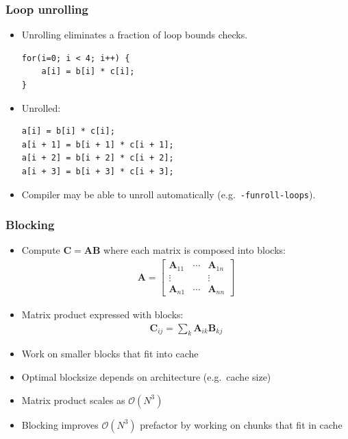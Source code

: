 \documentclass[usenames,dvipsnames,mathserif,compress]{beamer}
\begin{document}
\begin{frame}[fragile]
\frametitle{Loop unrolling}
\begin{itemize}
\item Unrolling eliminates a fraction of loop bounds checks.
\begin{lstlisting}
for(i=0; i < 4; i++) {
    a[i] = b[i] * c[i];
}
\end{lstlisting}
\item Unrolled:
\begin{lstlisting}
a[i] = b[i] * c[i];
a[i + 1] = b[i + 1] * c[i + 1];
a[i + 2] = b[i + 2] * c[i + 2];
a[i + 3] = b[i + 3] * c[i + 3];
\end{lstlisting}
\item Compiler may be able to unroll automatically (e.g.~\texttt{-funroll-loops}).
\end{itemize}
\end{frame}

\begin{frame}
  \frametitle{Blocking}
  \begin{itemize}
  \item
  Compute $\mathbf C = \mathbf A \mathbf B$ where each matrix is composed into
  blocks:
  \begin{align}
    \mathbf A = \left[
      \begin{matrix}
        \mathbf A_{11} &\cdots& \mathbf A_{1n}\\
        \vdots & & \vdots \\
        \mathbf A_{n1} & \cdots & \mathbf A_{nn}
      \end{matrix}\right]\nonumber
  \end{align}

\item Matrix product expressed with blocks:
  \begin{align}
    \mathbf C_{ij} = \sum_{k} \mathbf A_{ik} \mathbf B_{kj}\nonumber
  \end{align}
  \item Work on smaller blocks that fit into cache
  \item Optimal blocksize depends on architecture (e.g.\ cache size)
  \item Matrix product scales as $\mathcal O(N^3)$
  \item Blocking improves $\mathcal O(N^3)$ prefactor by working on
    chunks that fit in cache
  \end{itemize}
\end{frame}
\end{document}
